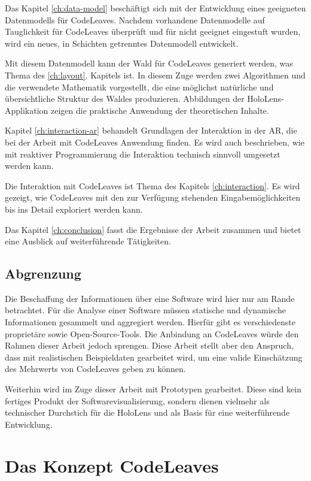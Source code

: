 Das Kapitel \ref{ch:data-model} beschäftigt sich mit der Entwicklung eines geeigneten Datenmodells für CodeLeaves. Nachdem vorhandene Datenmodelle auf Tauglichkeit für CodeLeaves überprüft und für nicht geeignet eingestuft wurden, wird ein neues, in Schichten getrenntes Datenmodell entwickelt.

Mit diesem Datenmodell kann der Wald für CodeLeaves generiert werden, was Thema des \ref{ch:layout}. Kapitels ist. In diesem Zuge werden zwei Algorithmen und die verwendete Mathematik vorgestellt, die eine möglichst natürliche und übersichtliche Struktur des Waldes produzieren. Abbildungen der HoloLens-Applikation zeigen die praktische Anwendung der theoretischen Inhalte.

Kapitel \ref{ch:interaction-ar} behandelt Grundlagen der Interaktion in der AR, die bei der Arbeit mit CodeLeaves Anwendung finden. Es wird auch beschrieben, wie mit reaktiver Programmierung die Interaktion technisch sinnvoll umgesetzt werden kann.

Die Interaktion mit CodeLeaves ist Thema des Kapitels \ref{ch:interaction}. Es wird gezeigt, wie CodeLeaves mit den zur Verfügung stehenden Eingabemöglichkeiten bis ins Detail exploriert werden kann.

Das Kapitel \ref{ch:conclusion} fasst die Ergebnisse der Arbeit zusammen und bietet eine Ausblick auf weiterführende Tätigkeiten.

\section{Abgrenzung}
\label{sec:distinction}

Die Beschaffung der Informationen über eine Software wird hier nur am Rande betrachtet. Für die Analyse einer Software müssen statische und dynamische Informationen gesammelt und aggregiert werden. Hierfür gibt es verschiedenste proprietäre sowie Open-Source-Tools. Die Anbindung an CodeLeaves würde den Rahmen dieser Arbeit jedoch sprengen. Diese Arbeit stellt aber den Anspruch, dass mit realistischen Beispieldaten gearbeitet wird, um eine valide Einschätzung des Mehrwerts von CodeLeaves geben zu können.

Weiterhin wird im Zuge dieser Arbeit mit Prototypen gearbeitet. Diese sind kein fertiges Produkt der Softwarevisualisierung, sondern dienen vielmehr als technischer Durchstich für die HoloLens und als Basis für eine weiterführende Entwicklung.

\chapter{Das Konzept CodeLeaves}
\label{ch:concept}

